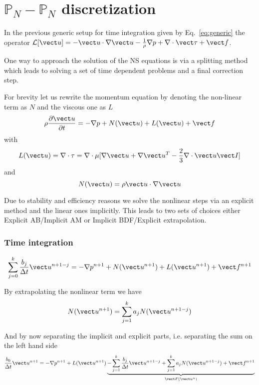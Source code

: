 \section{$\mathbb{P}_N-\mathbb{P}_N$ discretization}


In the previous generic setup for time integration given by Eq.~\ref{eq:generic} the operator $\mathcal{L}[\vect u]=-\vect u \cdot \nabla \vect u -\frac{1}{\rho}\nabla p+ \nabla \cdot \vect \tau+\vect f$.

One way to approach the solution of the NS equations is via a splitting method which leads to solving a set of time dependent problems and a final correction step. 

For brevity let us rewrite the momentum equation by denoting the non-linear term as $N$ and the viscous one as $L$
\begin{eqnarray}
\rho\frac{\partial \vect u}{\partial t} = - \nabla p+N( \vect u)  +L(\vect u)+\vect f
\end{eqnarray}
with
\begin{equation}
L(\vect u)=\nabla\cdot \tau =\nabla\cdot\mu[\nabla \vect u+\nabla \vect u^T-\frac{2}{3}\nabla \cdot \vect u \vect I]
\end{equation}
and
\begin{equation}
N(\vect u)=\rho\vect u\cdot\nabla \vect u
\end{equation}


Due to stability and efficiency reasons we solve the nonlinear steps via an explicit method and the linear ones implicitly. This leads to two sets of choices either Explicit AB/Implicit AM or Implicit BDF/Explicit extrapolation. 

\subsubsection*{Time integration}
\begin{eqnarray}
\sum\limits_{j=0}^k \frac{b_j}{\Delta t} \vect u^{n+1-j}  = - \nabla p^{n+1}+N( \vect u^{n+1})  +L(\vect u^{n+1})+\vect f^{n+1}
\end{eqnarray}

By extrapolating the nonlinear term we have
\begin{eqnarray}
N( \vect u^{n+1})=\sum\limits_{j=1}^k a_j N(\vect u^{n+1-j}) \nonumber
\end{eqnarray}

And by now separating the implicit and explicit parts, i.e. separating the sum on the left hand side
\begin{eqnarray}
\frac{b_0}{\Delta t} \vect u^{n+1}  = - \nabla p^{n+1}+L(\vect u^{n+1})\underbrace{-\sum\limits_{j=1}^k \frac{b_j}{\Delta t} \vect u^{n+1-j}+\sum\limits_{j=1}^k a_j N(\vect u^{n+1-j})+\vect f^{n+1}}_{\vect F(\vect u^{n})}
\end{eqnarray}\label{eq:discretevel}

